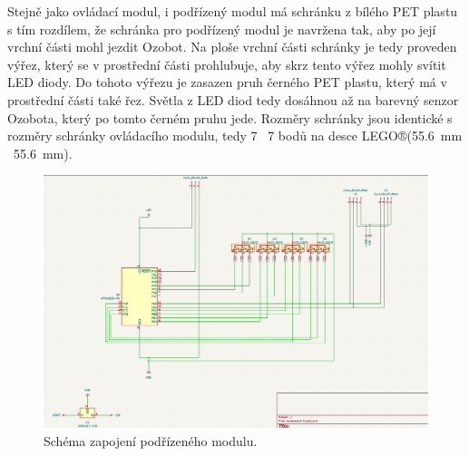         Stejně jako ovládací modul, i podřízený modul má schránku z bílého PET plastu s tím rozdílem, že schránka pro podřízený modul je navržena tak, aby po její vrchní části mohl jezdit Ozobot. Na ploše vrchní části schránky je tedy proveden výřez, který se v prostřední části prohlubuje, aby skrz tento výřez mohly svítit LED diody. Do tohoto výřezu je zasazen pruh černého PET plastu, který má v prostřední části také řez. Světla z LED diod tedy dosáhnou až na barevný senzor Ozobota, který po tomto černém pruhu jede. Rozměry schránky jsou identické s rozměry schránky ovládacího modulu, tedy 7 \texttimes~7 bodů na desce LEGO®(\SI{55.6}{mm} \texttimes~\SI{55.6}{mm}).
\begin{figure}[H]
        \begin{center}
            \includegraphics[scale=0.55]{images/schema_podrizeny.png}
          \caption{Schéma zapojení podřízeného modulu.}
        \end{center}      
          \label{fig:slave-design}
        \end{figure}

